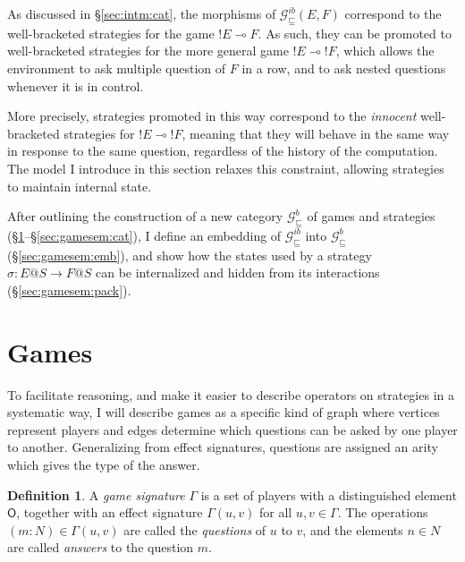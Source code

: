 \documentclass[11pt,oneside]{book}
\theoremstyle{definition}
\newtheorem{definition}[theorem]{Definition}
\newcommand{\gcat}{\mathcal{G}_{\sqsubseteq}}
\newcommand{\kw}[1]{\ensuremath{ \mathsf{#1} }}
\begin{document}
As discussed in \S\ref{sec:intm:cat},
the morphisms of $\gcat^{ib}(E, F)$
correspond to the well-bracketed strategies
for the game ${!E} \multimap F$.
As such, they can be promoted to well-bracketed strategies for
the more general game ${!E} \multimap {!F}$,
which allows the environment to ask
multiple question of $F$ in a row,
and to ask nested questions
whenever it is in control.

More precisely,
strategies promoted in this way
correspond to the \emph{innocent} well-bracketed strategies for
${!E} \multimap {!F}$,
meaning that they will behave in the same way
in response to the same question,
regardless of the history of the computation.
The model I introduce in this section
relaxes this constraint,
allowing strategies to maintain internal state.

After outlining the construction of a new category $\gcat^b$
of games and strategies
(\S\ref{sec:gamesem:games}--\S\ref{sec:gamesem:cat}),
I define an embedding of
$\gcat^{ib}$ into $\gcat^b$
(\S\ref{sec:gamesem:emb}),
and show how the states used by a strategy
$\sigma : E@S \rightarrow F@S$
can be internalized and
hidden from its interactions
(\S\ref{sec:gamesem:pack}).


\section{Games} \label{sec:gamesem:games} %

To facilitate reasoning,
and make it easier to describe operators on strategies
in a systematic way,
I will describe games as a specific kind of graph
where vertices represent players
and edges determine which questions can be asked
by one player to another.
Generalizing from effect signatures,
questions are assigned an arity
which gives the type of the answer.

\begin{definition}
A \emph{game signature} $\Gamma$
is a set of players with a distinguished element $\kw{O}$,
together with an effect signature $\Gamma(u, v)$
for all $u, v \in \Gamma$.
The operations $(m \mathbin: N) \in \Gamma(u, v)$ are called
the \emph{questions} of $u$ to $v$,
and the elements $n \in N$ are called
\emph{answers} to the question $m$.
\end{definition}
\end{document}
